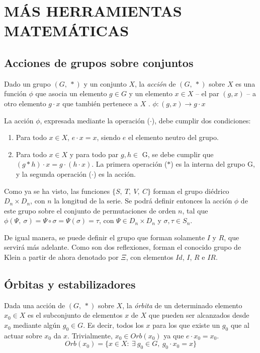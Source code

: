 \section{M\'AS HERRAMIENTAS MATEM\'ATICAS}\label{ch:acciones}
	\subsection{Acciones de grupos sobre conjuntos}
		Dado un grupo $(G,\ *)$ y un conjunto $X$, la \emph{acci\'on} de $(G,\ *)$ sobre $X$ es una funci\'on $\phi$ que asocia un elemento $g \in G$ y un elemento $x \in X$ -- el par $(g,x)$ -- a otro elemento $g\cdot x$ que tambi\'en pertenece a $X$ \cite{armstrong}. $\phi :(g,x) \to g\cdot x$
	
		La acci\'on $\phi$, expresada mediante la operaci\'on ($\cdot$), debe cumplir dos condiciones:
		\begin{enumerate}
			\item{Para todo $x\in X$, $e\cdot x=x$, siendo $e$ el elemento neutro del grupo.}
		
			\item{Para todo $x\in X$ y para todo par $g,h\in$ G, se debe cumplir que $(g*h)\cdot x=g\cdot (h\cdot x)$. La primera operaci\'on ($*$) es la interna del grupo G, y la segunda operaci\'on ($\cdot$) es la acci\'on.}
		\end{enumerate}
		Como ya se ha visto, las funciones $\{S,\ T,\ V,\ C\}$ forman el grupo di\'edrico ${D}_{n}\times{D}_{n}$, con $n$ la longitud de la serie. Se podr\'a definir entonces la acci\'on $\phi$ de este grupo sobre el conjunto de permutaciones de orden $n$, tal que $\phi(\Psi,\ \sigma)=\Psi\circ\sigma=\Psi(\sigma)=\tau$, con $\Psi\in{D}_{n}\times{D}_{n}$ y $\sigma,\tau\in{S}_n$.
		
		De igual manera, se puede definir el grupo que forman solamente $I$ y $R$, que servir\'a m\'as adelante. Como son dos reflexiones, forman el conocido grupo de Klein \textemdash a partir de ahora denotado por $\Xi$, con elementos $Id$, $I$, $R$ e $IR$.

	\subsection{\'Orbitas y estabilizadores}	
		Dada una acci\'on de $(G,\ *)$ sobre $X$, la \emph{\'orbita} de un determinado elemento $x_0\in X$ es el subconjunto de elementos $x$ de $X$ que pueden ser alcanzados desde $x_0$ mediante alg\'un $g_0\in G$. Es decir, todos los $x$ para los que existe un $g_0$ que al actuar sobre $x_0$ da $x$. Trivialmente, $x_0\in Orb(x_0)$ ya que $e\cdot x_0=x_0$.
		\[Orb(x_0)=\{x\in X :\ \exists \ g_0\in {G},\ g_0\cdot x_0 =x\}\]
	

